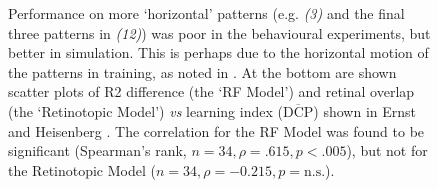 \begin{figure}
{Performance on more `horizontal' patterns (e.g. \emph{(3)} and the final three patterns in \emph{(12)}) was poor in the behavioural experiments, but better in simulation.
This is perhaps due to the horizontal motion of the patterns in training, as noted in \protect\cite{Ernst1999}.
At the bottom are shown scatter plots of R2 difference (the `RF Model') and retinal overlap (the `Retinotopic Model') \emph{vs} learning index ($\overline{\mathrm{DCP}}$) shown in Ernst and Heisenberg \protect\cite{Ernst1999}.
The correlation for the RF Model was found to be significant (Spearman's rank, $n=34, \rho=.615, p<.005$), but not for the Retinotopic Model ($n=34, \rho= -0.215, p=\mathrm{n.s.}$).
}
\label{fig:pattern}
\end{figure}
